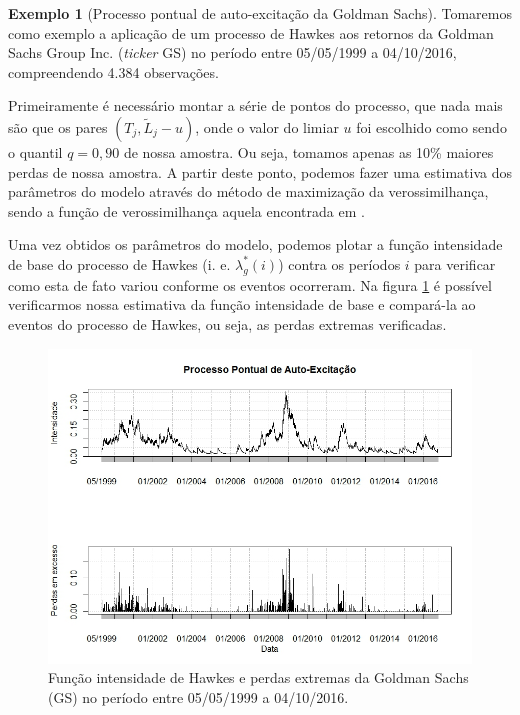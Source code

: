 \documentclass[review]{elsarticle}
\theoremstyle{definition}
\newtheorem{exemplo}[teor]{Exemplo}
\begin{document}
\begin{exemplo}[Processo pontual de auto-excitação da Goldman Sachs]
	\label{exe:GS}
	Tomaremos como exemplo a aplicação de um processo de Hawkes aos retornos da Goldman Sachs Group Inc. (\emph{ticker} GS) no período entre 05/05/1999 a 04/10/2016, compreendendo 4.384 observações.
\end{exemplo}
Primeiramente é necessário montar a série de pontos do processo, que nada mais são que os pares $(T_j, \tilde{L}_j-u)$, onde o valor do limiar $u$ foi escolhido como sendo o quantil $q=0,90$ de nossa amostra. Ou seja, tomamos apenas as 10\% maiores perdas de nossa amostra. A partir deste ponto, podemos fazer uma estimativa dos parâmetros do modelo através do método de maximização da verossimilhança, sendo a função de verossimilhança aquela encontrada em \cite[eq. (7) p. ~6]{Harte2010}.

Uma vez obtidos os parâmetros do modelo, podemos plotar a função intensidade de base do processo de Hawkes (i. e. $\lambda^*_g(i)$) contra os períodos $i$ para verificar como esta de fato variou conforme os eventos ocorreram. Na figura \ref{fig:figevtGS} é possível verificarmos nossa estimativa da função intensidade de base e compará-la ao eventos do processo de Hawkes, ou seja, as perdas extremas verificadas.

\begin{figure}[ht]
	\centering
	\includegraphics[width=0.9\linewidth]{figs/figevtGS}
	\caption[Intensidade de Hawkes para Goldman Sachs]{Função intensidade de Hawkes e perdas extremas da Goldman Sachs (GS) no período entre 05/05/1999 a 04/10/2016.}
	\label{fig:figevtGS}
\end{figure}
\end{document}
